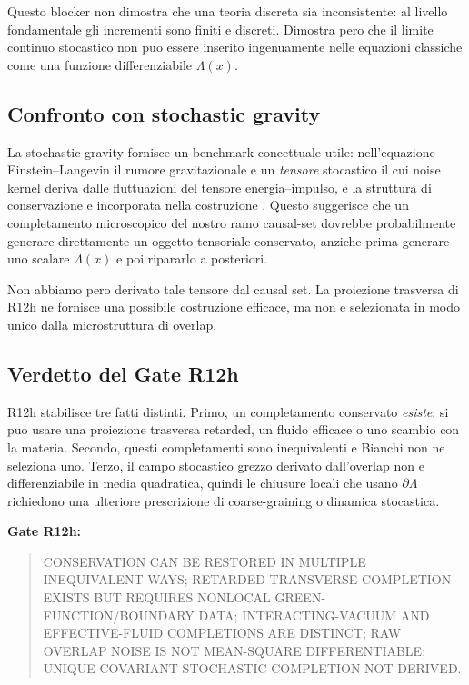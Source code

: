 \documentclass[11pt,a4paper]{article}
\begin{document}
Questo blocker non dimostra che una teoria discreta sia inconsistente: al livello fondamentale gli incrementi sono finiti e discreti. Dimostra pero che il limite continuo stocastico non puo essere inserito ingenuamente nelle equazioni classiche come una funzione differenziabile $\Lambda(x)$.

\subsection{Confronto con stochastic gravity}

La stochastic gravity fornisce un benchmark concettuale utile: nell'equazione Einstein--Langevin il rumore gravitazionale e un \emph{tensore} stocastico il cui noise kernel deriva dalle fluttuazioni del tensore energia--impulso, e la struttura di conservazione e incorporata nella costruzione \cite{HuVerdaguer2008}. Questo suggerisce che un completamento microscopico del nostro ramo causal-set dovrebbe probabilmente generare direttamente un oggetto tensoriale conservato, anziche prima generare uno scalare $\Lambda(x)$ e poi ripararlo a posteriori.

Non abbiamo pero derivato tale tensore dal causal set. La proiezione trasversa di R12h ne fornisce una possibile costruzione efficace, ma non e selezionata in modo unico dalla microstruttura di overlap.

\subsection{Verdetto del Gate R12h}

R12h stabilisce tre fatti distinti. Primo, un completamento conservato \emph{esiste}: si puo usare una proiezione trasversa retarded, un fluido efficace o uno scambio con la materia. Secondo, questi completamenti sono inequivalenti e Bianchi non ne seleziona uno. Terzo, il campo stocastico grezzo derivato dall'overlap non e differenziabile in media quadratica, quindi le chiusure locali che usano $\partial\Lambda$ richiedono una ulteriore prescrizione di coarse-graining o dinamica stocastica.

\textbf{Gate R12h:}
\begin{quote}\small\textsf{CONSERVATION CAN BE RESTORED IN MULTIPLE INEQUIVALENT WAYS; RETARDED TRANSVERSE COMPLETION EXISTS BUT REQUIRES NONLOCAL GREEN-FUNCTION/BOUNDARY DATA; INTERACTING-VACUUM AND EFFECTIVE-FLUID COMPLETIONS ARE DISTINCT; RAW OVERLAP NOISE IS NOT MEAN-SQUARE DIFFERENTIABLE; UNIQUE COVARIANT STOCHASTIC COMPLETION NOT DERIVED}.\end{quote}
\end{document}
